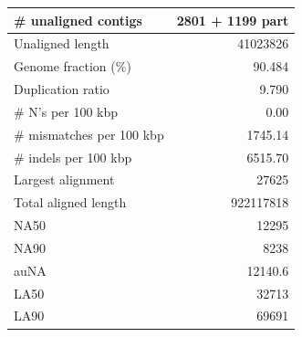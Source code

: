 \documentclass[12pt,a4paper]{article}
\begin{document}
\begin{table}[ht]
\begin{center}
\begin{tabular}{|l*{1}{|r}|}
\# unaligned contigs & 2801 + 1199 part \\ \hline
Unaligned length & 41023826 \\ \hline
Genome fraction (\%) & 90.484 \\ \hline
Duplication ratio & 9.790 \\ \hline
\# N's per 100 kbp & 0.00 \\ \hline
\# mismatches per 100 kbp & 1745.14 \\ \hline
\# indels per 100 kbp & 6515.70 \\ \hline
Largest alignment & 27625 \\ \hline
Total aligned length & 922117818 \\ \hline
NA50 & 12295 \\ \hline
NA90 & 8238 \\ \hline
auNA & 12140.6 \\ \hline
LA50 & 32713 \\ \hline
LA90 & 69691 \\ \hline
\end{tabular}
\end{center}
\end{table}
\end{document}
